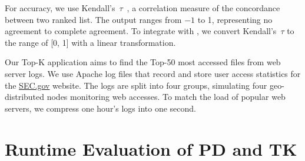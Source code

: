 For accuracy, we use Kendall's~$\tau$~\cite{abdi2007kendall}, a correlation
measure of the concordance between two ranked list. The output ranges from
\(-1\) to 1, representing no agreement to complete agreement. To integrate with
\sysname{}, we convert Kendall's~$\tau$ to the range of [0, 1] with a linear
transformation.

Our Top-K application aims to find the Top-50 most accessed files from web
server logs. We use Apache log files that record and store user access
statistics for the \href{https://www.sec.gov}{SEC.gov} website. The logs are
split into four groups, simulating four geo-distributed nodes monitoring web
accesses. To match the load of popular web servers, we compress one hour's logs
into one second.

\section{Runtime Evaluation of PD and TK}
\label{appendix:more-runtime}

